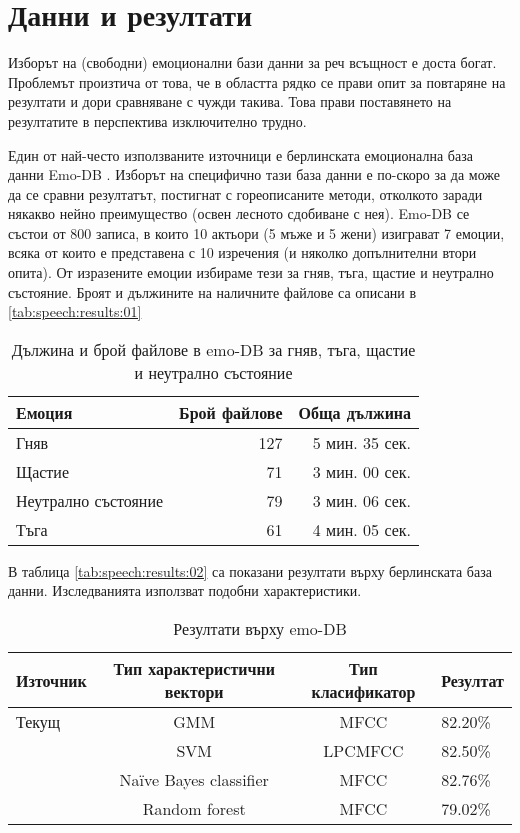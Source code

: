 \documentclass[main.tex]{subfiles}
\begin{document}
\section{Данни и резултати}
Изборът на (свободни) емоционални бази данни за реч всъщност е доста богат. Проблемът произтича от това, че в областта рядко се прави опит за повтаряне на резултати и дори сравняване с чужди такива. Това прави поставянето на резултатите в перспектива изключително трудно. 

Един от най-често използваните източници е берлинската емоционална база данни Emo-DB \cite{berlin}. Изборът на специфично тази база данни е по-скоро за да може да се сравни резултатът, постигнат с гореописаните методи, отколкото заради някакво нейно преимущество (освен лесното сдобиване с нея). Emo-DB се състои от 800 записа, в които 10 актьори (5 мъже и 5 жени) изиграват 7 емоции, всяка от които е представена с 10 изречения (и няколко допълнителни втори опита). От изразените емоции избираме тези за гняв, тъга, щастие и неутрално състояние. Броят и дължините на наличните файлове са описани в \autoref{tab:speech:results:01}

\begin{table}[h]
    \begin{center}
    \begin{tabular}{|l|r|r|} 
        \hline
        Емоция & Брой файлове & Обща дължина\\ 
        \hline
        Гняв & 127 & 5 мин. 35 сек.\\ 
        Щастие &  71 & 3 мин. 00 сек.\\ 
        Неутрално състояние &  79 & 3 мин. 06 сек.\\ 
        Тъга &  61 & 4 мин. 05 сек.\\ 
        \hline
    \end{tabular}
    \caption{Дължина и брой файлове в emo-DB за гняв, тъга, щастие и неутрално състояние}
    \label{tab:speech:results:01}
    \end{center}
\end{table}

В таблица \autoref{tab:speech:results:02} са показани резултати върху берлинската база данни. Изследванията използват подобни характеристики.
\begin{table}[h]
\begin{center}
    \begin{tabular}{ |l|c|c|l| } 
     \hline
     Източник & Тип характеристични вектори & Тип класификатор & Резултат \\ 
     \hline
     Текущ & GMM & MFCC & 82.20\% \\ 
     \cite{first} & SVM & LPCMFCC & 82.50\% \\ 
     \cite{second} &  Naïve Bayes classifier & MFCC & 82.76\% \\ 
     \cite{third} &  Random forest & MFCC & 79.02\% \\ 
     \hline
    \end{tabular}
    \caption{Резултати върху emo-DB}
    \label{tab:speech:results:02}
    \end{center}
\end{table}
\end{document}
